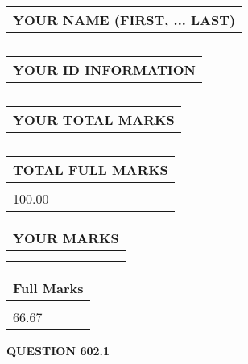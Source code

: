 \documentclass{ctexart}
\begin{document}
   
   
   
\newpage 
\setcounter{page}{ 
   602001 } 
   
   
   
   
\noindent\begin{tabular}{|l|}
\hline
YOUR NAME (FIRST, ... LAST)  \\
\hline
 \\ 
 \\ 
\hline
\end{tabular}
\hspace{0.05in} \begin{tabular}{|l|}
\hline
 YOUR   ID   INFORMATION  \\
\hline
 \\ 
 \\ 
\hline
\end{tabular}
   
   
\vspace{0.2in}\noindent\begin{tabular}{|l|}
\hline
YOUR TOTAL MARKS  \\
\hline
 \\ 
 \\ 
\hline
\end{tabular}
\hspace{0.05in} \begin{tabular}{|l|}
\hline
TOTAL FULL MARKS  \\
\hline
 \\ 
100.00 \\
\hline
\end{tabular}
   
   
 \vspace{0.2in}
 
 
 
 
   
   
  
\vspace{0.2in}
  
\noindent\begin{tabular}{|l|}
\hline
 YOUR MARKS  \\
\hline
 \\ 
 \\ 
\hline
\end{tabular}
\hspace{0.05in} \begin{tabular}{|l|}
\hline
 Full Marks  \\
\hline
 \\ 
66.67 \\
\hline
\end{tabular}
{\textbf{\Large{QUESTION
602.1 
}}}
  
\end{document}
